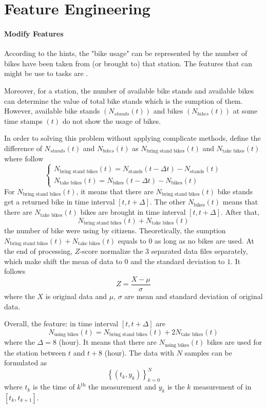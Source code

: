 \section{Feature Engineering}
\paragraph{Modify Features}
According to the hints, the "bike usage" can be represented by the number of 
bikes have been taken from (or brought to) that station.
The features that can might be use to tasks are 
.

Moreover, for a station, the number of available bike stands and available bikes can 
determine the value of total bike stands which is the sumption of them. 
However, available bike stands $(N_{stands}(t))$ and bikes $(N_{bikes}(t))$ 
at some time stamps $(t)$ do not show the usage of bikes. 

In order to solving this problem without 
applying complicate methods, 
define the difference of $N_{stands}(t)$ 
and $N_{bikes}(t)$ as $N_{\text{bring stand bikes}}(t) $ and 
$N_{\text{take bikes}}(t) $ where follow
\[
    \begin{cases}
        N_{\text{bring stand bikes}}(t) 
        = 
        N_{\text{stands}}(t-\Delta t) 
        - 
        N_{\text{stands}}(t) \\
        N_{\text{take bikes}}(t) 
        = 
        N_{\text{bikes}}(t-\Delta t) 
        - 
        N_{\text{bikes}}(t)
    \end{cases}
\]
For $N_{\text{bring stand bikes}}(t)$,
it means that 
there are $N_{\text{bring stand bikes}}(t)$ bike stands 
get a returned bike in 
time interval $[t, t+\Delta]$.
The other $N_{\text{bikes}}(t)$ means that there are
$N_{\text{take bikes}}(t)$ bikes are brought in 
time interval $[t, t+\Delta]$.
After that, 
\[
N_{\text{bring stand bikes}}(t)  + N_{\text{take bikes}}(t) 
\]
the number of bike were using by citizens.
Theoretically, the sumption 
$
N_{\text{bring stand bikes}}(t)  + N_{\text{take bikes}}(t) 
$ equals to $0$
as long as no bikes are used.
At the end of processing, $Z$-score normalize the $3$ separated data files
separately, which make shift the mean of data to $0$ and the 
standard deviation to $1$.
It follows 
\[
    Z = \frac{X - \mu}{\sigma}
\]
where the $X$ is original data and $\mu$, $\sigma$ are mean and 
standard deviation of original data.

Overall, the feature:  in time interval $[t, t+\Delta]$ are 
\[
    N_{\text{using bikes}}(t) = N_{\text{bring stand bikes}}(t)  +  2N_{\text{take bikes}}(t) 
\]
where the $\Delta = 8$ (hour). It means that there are $N_{\text{using bikes}}(t)$
bikes are used for the station between $t$ and $t+8$ (hour). 
The data with $N$ samples can be formulated as  
\[
   \left\{(t_k, y_k)\right\}_{k = 0}^{N}
\]where $t_k$ is the time of $k^{\text{th}}$ the measurement and 
$y_k$ is the $k$ measurement of  in $\left[t_k, t_{k+1}\right]$.

